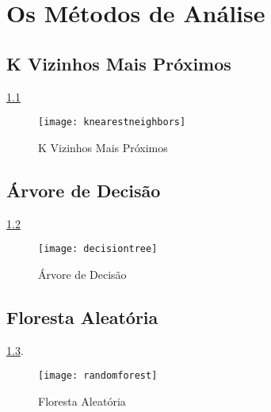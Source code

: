 \chapter{Os Métodos de Análise}
\label{chapter:os_metodos_de_analise}

\section{\textbf{K Vizinhos Mais Próximos}}

\ref{fig:knearestneighbors}

\begin{figure}[!htb]
\begin{center}
\caption{K Vizinhos Mais Próximos}
\texttt{[image: knearestneighbors]}
\label{fig:knearestneighbors}
\end{center}
\end{figure}

\section{\textbf{Árvore de Decisão}}

\ref{fig:decisiontree}

\begin{figure}[!htb]
\begin{center}
\caption{Árvore de Decisão}
\texttt{[image: decisiontree]}
\label{fig:decisiontree}
\end{center}
\end{figure}


\section{\textbf{Floresta Aleatória}}

\ref{fig:randomforest}.


\begin{figure}[!htb]
\begin{center}
\caption{Floresta Aleatória}
\texttt{[image: randomforest]}
\label{fig:randomforest}
\end{center}
\end{figure}


